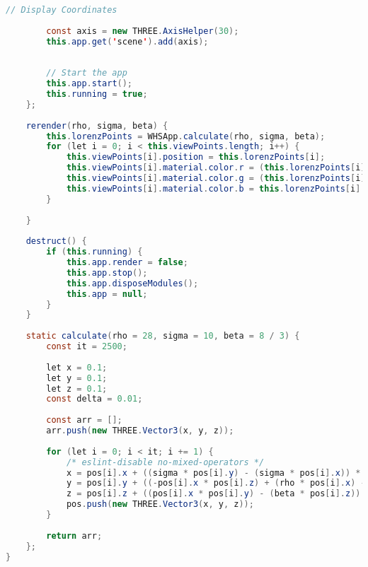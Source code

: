\begin{lstlisting}[style=C, language=Java]
		// Display Coordinates
		
		const axis = new THREE.AxisHelper(30);
		this.app.get('scene').add(axis);
		
		
		// Start the app
		this.app.start();
		this.running = true;
	};
	
	rerender(rho, sigma, beta) {
		this.lorenzPoints = WHSApp.calculate(rho, sigma, beta);
		for (let i = 0; i < this.viewPoints.length; i++) {
			this.viewPoints[i].position = this.lorenzPoints[i];
			this.viewPoints[i].material.color.r = (this.lorenzPoints[i].x+10)/20;
			this.viewPoints[i].material.color.g = (this.lorenzPoints[i].y+10)/20;
			this.viewPoints[i].material.color.b = this.lorenzPoints[i].z/30;
		}
	
	}
	
	destruct() {
		if (this.running) {
			this.app.render = false;
			this.app.stop();
			this.app.disposeModules();
			this.app = null;
		}
	}
	
	static calculate(rho = 28, sigma = 10, beta = 8 / 3) {
		const it = 2500;
		
		let x = 0.1;
		let y = 0.1;
		let z = 0.1;
		const delta = 0.01;
		
		const arr = [];
		arr.push(new THREE.Vector3(x, y, z));
		
		for (let i = 0; i < it; i += 1) {
			/* eslint-disable no-mixed-operators */
			x = pos[i].x + ((sigma * pos[i].y) - (sigma * pos[i].x)) * delta;
			y = pos[i].y + ((-pos[i].x * pos[i].z) + (rho * pos[i].x) - pos[i].y) * delta;
			z = pos[i].z + ((pos[i].x * pos[i].y) - (beta * pos[i].z)) * delta;
			pos.push(new THREE.Vector3(x, y, z));
		}
		
		return arr;
	};
}
\end{lstlisting}

\bigskip

